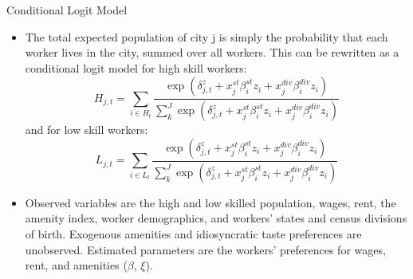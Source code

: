 \documentclass[aspectratio=169]{beamer}
\begin{document}
\begin{frame}{Conditional Logit Model}

\begin{itemize}
    \item<1-> The total expected population of city j is simply the probability that each worker lives in the city, summed over all workers.  This can be rewritten as a conditional logit model for high skill workers:
    \begin{equation*}
        H_{j,t} = \sum_{i \in H_{t}} \frac{\exp\left( \delta_{j,t}^{z} + x_{j}^{st}\beta_{i}^{st} z_{i} + x_{j}^{div} \beta_{i}^{div} z_{i} \right)}{\sum_{k}^{J} \exp\left( \delta_{j,t}^{z} + x_{j}^{st}\beta_{i}^{st} z_{i} + x_{j}^{div} \beta_{i}^{div} z_{i} \right)}
    \end{equation*}
    and for low skill workers:
    \begin{equation*}
        L_{j,t} = \sum_{i \in L_{t}} \frac{\exp\left( \delta_{j,t}^{z} + x_{j}^{st}\beta_{i}^{st} z_{i} + x_{j}^{div} \beta_{i}^{div} z_{i} \right)}{\sum_{k}^{J} \exp\left( \delta_{j,t}^{z} + x_{j}^{st}\beta_{i}^{st} z_{i} + x_{j}^{div} \beta_{i}^{div} z_{i} \right)}
    \end{equation*}
    \item<2->Observed variables are the high and low skilled population, wages, rent, the amenity index, worker demographics, and workers’ states and census divisions of birth.  Exogenous amenities and idiosyncratic taste preferences are unobserved.  Estimated parameters are the workers’ preferences for wages, rent, and amenities ($ \beta $, $ \xi $).
\end{itemize}
    
\end{frame}

\end{document}
